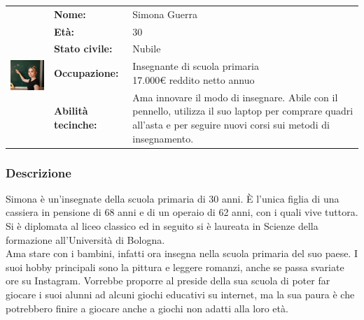\documentclass[../Report.tex]{subfiles}
\begin{document}
    \begin{table}[H]
        \begin{tabular}{|c|l|p{7cm}|}
            \hline
            \multirow{5}{*}{\includegraphics[width=5cm, height=5cm]{Simona.jpg}} 
                & \textbf{Nome:} & Simona Guerra\\ \cmidrule{2-3}
            & \textbf{Età:} & 30 \\ \cmidrule{2-3}
            & \textbf{Stato civile:} & Nubile \\ \cmidrule{2-3}
            & \textbf{Occupazione:} & \makecell{Insegnante di scuola primaria \\ 17.000€ reddito netto annuo} \\ \cmidrule{2-3}
            & \textbf{Abilità tecinche:} &  Ama innovare il modo di insegnare. Abile con il pennello, utilizza il suo laptop per comprare quadri all'asta e per seguire nuovi corsi sui metodi di insegnamento.\\
            \hline
        \end{tabular}
    \end{table}

    \subsubsection{Descrizione}
    Simona è un'insegnate della scuola primaria di 30 anni. È l'unica figlia di una cassiera in pensione di 68 anni e di un operaio di 62 anni, con i quali vive tuttora. Si è diplomata al liceo classico ed in seguito si è laureata in Scienze della formazione all'Università di Bologna.\\
    Ama stare con i bambini, infatti ora insegna nella scuola primaria del suo paese. I suoi hobby principali sono la pittura e leggere romanzi, anche se passa svariate ore su Instagram. Vorrebbe proporre al preside della sua scuola di poter far giocare i suoi alunni ad alcuni giochi educativi su internet, ma la sua paura è che potrebbero finire a giocare anche a giochi non adatti alla loro età.
\end{document}
